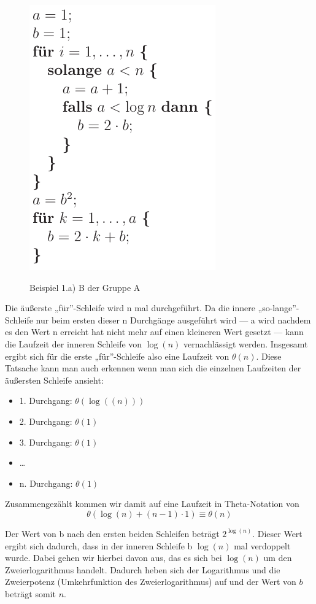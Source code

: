 \documentclass[a4paper, 12pt]{article}
\begin{document}
\begin{figure}[H]
	\caption{Beispiel 1.a) B der Gruppe A}
	\vskip 0.2cm
	\centering
	\includegraphics{Figures/Test_2008-11-07_1AaB}
	\label{figure:Test_2008-11-07_1AaB}
\end{figure}

Die äußerste „für”-Schleife wird n mal durchgeführt. Da die innere „so-lange”-Schleife nur beim ersten dieser n Durchgänge ausgeführt wird — a wird nachdem es den Wert n erreicht hat nicht mehr auf einen kleineren Wert gesetzt — kann die Laufzeit der inneren Schleife von $\log(n)$ vernachlässigt werden. Insgesamt ergibt sich für die erste „für”-Schleife also eine Laufzeit von $θ(n)$. Diese Tatsache kann man auch erkennen wenn man sich die einzelnen Laufzeiten der äußersten Schleife ansieht:

\begin{itemize}
	\item 1. Durchgang: $θ\left(\log(\left(n\right)) \right)$
	\item 2. Durchgang: $θ(1)$
	\item 3. Durchgang: $θ(1)$
	\item \dots
	\item n. Durchgang: $θ(1)$
\end{itemize}

Zusammengezählt kommen wir damit auf eine Laufzeit in Theta-Notation von \[θ\left(\log(n)+\left(n-1\right)⋅ 1\right) \equiv θ\left(n\right)\]

Der Wert von b nach den ersten beiden Schleifen beträgt $2^{\log(n)}$. Dieser Wert ergibt sich dadurch, dass in der inneren Schleife b $\log(n)$ mal verdoppelt wurde. Dabei gehen wir hierbei davon aus, das es sich bei $\log(n)$ um den Zweierlogarithmus handelt. Dadurch heben sich der Logarithmus und die Zweierpotenz (Umkehrfunktion des Zweierlogarithmus) auf und der Wert von $b$ beträgt somit $n$.\\
\end{document}
